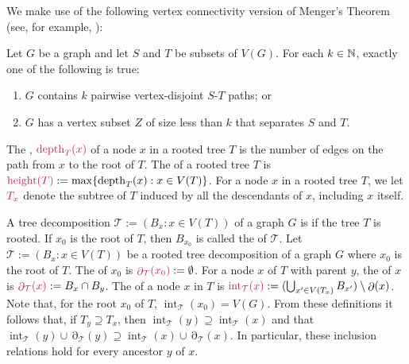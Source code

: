 \documentclass{patmorin}
\newcommand{\pat}[1]{\textcolor{Blue}{[Pat: #1]}}
\DeclareMathOperator{\depth}{depth}
\DeclareMathOperator{\height}{height}
\DeclareMathOperator{\interior}{int}
\DeclareMathOperator{\boundary}{\partial}
\newcommand{\hussein}[1]{\textcolor{purple}{HH: #1}}
\begin{document}
We make use of the following vertex connectivity version of Menger's Theorem (see, for example, \citet[Theorem~3.3.1]{diestel2017graph}): \

\begin{thm}\label{menger}
  Let $G$ be a graph and let $S$ and $T$ be subsets of $V(G)$. For each $k\in\mathbb{N}$, exactly one of the following is true:
  \begin{enumerate}[nosep,nolistsep,label=\rm(\roman*),ref=(\roman*)2]
      \item $G$ contains $k$ pairwise vertex-disjoint $S$-$T$ paths; or
      \item $G$ has a vertex subset $Z$ of size less than $k$ that separates $S$ and $T$.
  \end{enumerate}
\end{thm}

The , $\mathdefin{\depth_T(x)}$ of a node $x$ in a rooted tree $T$ is the number of edges on the path from $x$ to the root of $T$. The  of a rooted tree $T$ is $\mathdefin{\height(T)}:=\max\{\depth_T(x):x\in V(T)\}$. For a node $x$ in a rooted tree $T$, we let $\mathdefin{T_x}$ denote the subtree of $T$ induced by all the descendants of $x$, including $x$ itself.

A tree decomposition $\mathcal{T}:=(B_x:x\in V(T))$ of a graph $G$ is  if the tree $T$ is rooted. If $x_0$ is the root of $T$, then $B_{x_0}$ is called the  of $\mathcal{T}$.  Let $\mathcal{T}:=(B_x:x\in V(T))$ be a rooted tree decomposition of a graph $G$ where $x_0$ is the root of $T$.   The  of $x_0$ is $\mathdefin{\boundary_{\mathcal{T}}(x_0)}:=\emptyset$.  For a node $x$ of $T$ with parent $y$, the  of $x$ is $\mathdefin{\boundary_\mathcal{T}(x)}:=B_x\cap B_y$.  The  of a node $x$ in $T$ is $\mathdefin{\interior_\mathcal{T}(x)}:=(\bigcup_{x'\in V(T_x)} B_{x'})\setminus \boundary(x)$.  Note that, for the root $x_0$ of $T$, $\interior_{\mathcal{T}}(x_0)=V(G)$.  From these definitions it follows that, if $T_y\supseteq T_x$, then $\interior_{\mathcal{T}}(y)\supseteq\interior_{\mathcal{T}}(x)$ and that $\interior_\mathcal{T}(y) \cup \boundary_\mathcal{T}(y)\supseteq \interior_\mathcal{T}(x) \cup \boundary_\mathcal{T}(x)$. In particular, these inclusion relations hold for every ancestor $y$ of $x$.



\end{document}
